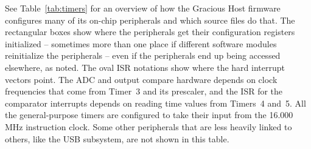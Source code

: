 See Table~\ref{tab:timers} for an overview of how the Gracious Host
firmware configures many of its on-chip peripherals and which source files
do that.  The rectangular boxes show where the peripherals get their
configuration registers initialized -- sometimes more than one place if
different software modules reinitialize the peripherals -- even if the
peripherals end up being accessed elsewhere, as noted.  The oval ISR
notations show where the hard interrupt vectors point.  The ADC and output
compare hardware depends on clock frequencies that come from Timer~3 and its
prescaler, and the ISR for the comparator interrupts depends on reading time
values from Timers~4 and~5.  All the general-purpose timers are configured
to take their input from the 16.000\,MHz instruction clock.  Some other
peripherals that are less heavily linked to others, like the USB subsystem,
are not shown in this table.

